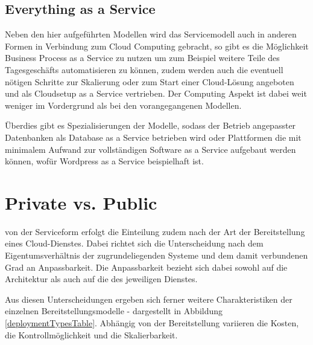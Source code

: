 \subsection{Everything as a Service}
Neben den hier aufgeführten Modellen wird das Servicemodell auch in anderen Formen in Verbindung zum Cloud Computing gebracht, so gibt es die Möglichkeit Business Process as a Service zu nutzen um zum Beispiel weitere Teile des Tagesgeschäfts automatisieren zu können, zudem werden auch die eventuell nötigen Schritte zur Skalierung oder zum Start einer Cloud-Lösung angeboten und als Cloudsetup as a Service vertrieben. Der Computing Aspekt ist dabei weit weniger im Vordergrund als bei den vorangegangenen Modellen. 

Überdies gibt es Spezialisierungen der Modelle, sodass der Betrieb angepasster Datenbanken als Database as a Service betrieben wird oder Plattformen die mit minimalem Aufwand zur vollständigen Software as a Service aufgebaut werden können, wofür Wordpress as a Service beispielhaft ist.

\newpage
\section{Private vs. Public}
\label{sec_privacy_models}

 von der Serviceform erfolgt die Einteilung zudem nach der Art der Bereitstellung eines Cloud-Dienstes. Dabei richtet sich die Unterscheidung nach dem Eigentumsverhältnis der zugrundeliegenden Systeme und dem damit verbundenen Grad an Anpassbarkeit. Die Anpassbarkeit bezieht sich dabei sowohl auf die Architektur als auch auf die des jeweiligen Dienstes. 

Aus diesen Unterscheidungen ergeben sich ferner weitere Charakteristiken der einzelnen Bereitstellungsmodelle - dargestellt in Abbildung \ref{deploymentTypesTable}. Abhängig von der Bereitstellung variieren die Kosten, die Kontrollmöglichkeit und die Skalierbarkeit.

